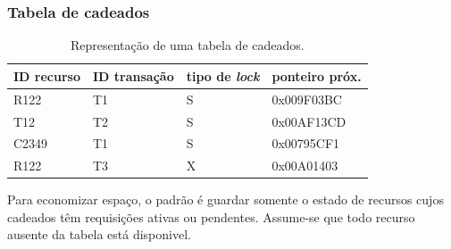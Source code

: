\documentclass{beamer}
\begin{document}
\begin{frame} %
    \frametitle{Tabela de cadeados}

    \begin{table}
    \begin{tabular}{l l l l}
        \toprule

        \textbf{ID recurso} & \textbf{ID transação} & \textbf{tipo de \emph{lock}} & \textbf{ponteiro próx.}\\

        \midrule

        R122 & T1 & S & 0x009F03BC \\
        T12 & T2 & S & 0x00AF13CD \\
        C2349 & T1 & S & 0x00795CF1 \\
        R122 & T3 & X & 0x00A01403 \\

        \bottomrule
    \end{tabular}
    \caption{Representação de uma tabela de cadeados.}
    \end{table}

    \medskip
    Para economizar espaço, o padrão é guardar somente o estado de recursos cujos cadeados têm requisições ativas ou pendentes. Assume-se que todo recurso ausente da tabela está disponivel.
\end{frame}
    
    
\end{document}
